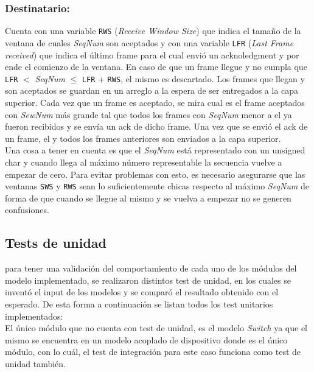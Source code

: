 \documentclass[10pt,a4paper]{article}
\begin{document}
\subsubsection{Destinatario:}
Cuenta con una variable \texttt{RWS} (\textit{Receive Window Size}) que indica el tamaño de la ventana de cuales \textit{SeqNum} son aceptados y con una variable \texttt{LFR} (\textit{Last Frame received}) que indica el último frame para el cual envió un acknoledgment y por ende el comienzo de la ventana. En caso de que un frame llegue y no cumpla que \texttt{LFR} $<$ \textit{SeqNum} $\leq$ \texttt{LFR} + \texttt{RWS}, el mismo es descartado. Los frames que llegan y son aceptados se guardan en un arreglo a la espera de ser entregados a la capa superior. Cada vez que un frame es aceptado, se mira cual es el frame aceptados con \textit{SewNum} más grande tal que todos los frames con \textit{SeqNum} menor a el ya fueron recibidos y se envía un ack de dicho frame. Una vez que se envió el ack de un frame, el y todos los frames anteriores son enviados a la capa superior. \\

Una cosa a tener en cuenta es que el \textit{SeqNum} está representado con un unsigned char y cuando llega al máximo número representable la secuencia vuelve a empezar de cero. Para evitar problemas con esto, es necesario asegurarse que las ventanas \texttt{SWS} y \texttt{RWS} sean lo suficientemente chicas respecto al máximo \textit{SeqNum} de forma de que cuando se llegue al mismo y se vuelva a empezar no se generen confusiones. \\

\subsection{Tests de unidad}

para tener una validación del comportamiento de cada uno de los módulos del modelo implementado, se realizaron distintos test de unidad, en los cuales se inventó el input de los modelos y se comparó el resultado obtenido con el esperado. De esta forma a continuación se listan todos los test unitarios implementados: \\

El único módulo que no cuenta con test de unidad, es el modelo \textit{Switch} ya que el mismo se encuentra en un modelo acoplado de dispositivo donde es el único módulo, con lo cuál, el test de integración para este caso funciona como test de unidad también. \\
\end{document}
